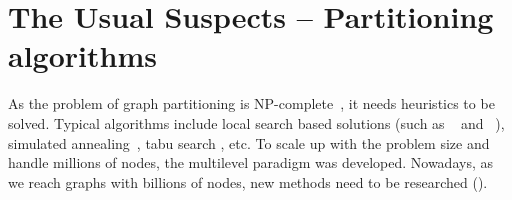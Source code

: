 \documentclass[11pt,a4paper]{report} %
\theoremstyle{customdef}
\newtheorem{definition}{Definition}
\newenvironment{defi}[2]
 {\begin{definition}[#1]\label{#2}\end{definition}\begin{siderules}}
 {\end{siderules}}
\begin{document}








\section{The Usual Suspects -- Partitioning algorithms}\label{sec:part-algo}
As the problem of graph partitioning is NP-complete~\citep{Garey1976}, it needs heuristics to be solved.
Typical algorithms include local search based solutions (such as ~\citep{Kernighan1970} and ~\citep{Fiduccia1982}), simulated annealing~\citep{Johnson1989}, %
tabu search \citep{Pirlot1996}, etc.
To scale up with the problem size and handle millions of nodes, the multilevel paradigm was developed.
Nowadays, as we reach graphs with billions of nodes, new methods need to be researched (\citep{Tsourakakis2014, export:183714}).
\end{document}
